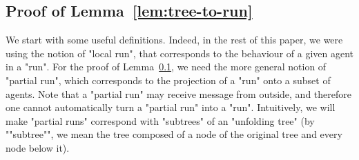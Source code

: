 \subsection{Proof of Lemma~\ref{lem:tree-to-run}}
\label{app:tree-to-run}

\LemTreeToRun*

We start with some useful definitions. Indeed, in the rest of this paper, we were using the notion of "local run", that corresponds to the behaviour of a given agent in a "run". For the proof of Lemma~\ref{app:tree-to-run}, we need the more general notion of "partial run", which corresponds to the projection of a "run" onto a subset of agents. Note that a "partial run" may receive message from outside, and therefore one cannot automatically turn a "partial run" into a "run". Intuitively, we will make "partial runs" correspond with "subtrees" of an "unfolding tree" (by ""subtree"", we mean the tree composed of a node of the original tree and every node below it). 

